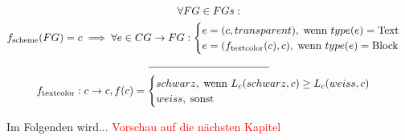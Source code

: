 \begin{equation}
\begin{gathered}
	    \forall FG \in FGs:\\
	    f_\text{scheme}(FG) = c \implies \forall e \in CG \to FG:
  	\begin{cases}
		e = (c, transparent),\; \text{wenn } type(e) = \text{Text} \\
		e = (f_\text{textcolor}(c), c), \; \text{wenn } type(e) = \text{Block}
	\end{cases}\\
	  \mathclap{\rule{4cm}{0.4pt}}\\
 	f_\text{textcolor}: c \to c, f(c) =
  		   	\begin{cases}
  		   		schwarz,\; \text{wenn } L_c(schwarz, c) \geq L_c(weiss, c) \\
		weiss,\; \text{sonst} \\
	\end{cases}
\end{gathered}
\end{equation}

Im Folgenden wird...
\textcolor{red}{Vorschau auf die nächsten Kapitel}

  

